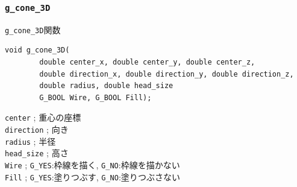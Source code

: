 \documentclass[platex,a4paper,12pt]{jsarticle}%
\begin{document}




\clearpage
\subsubsection{\texttt{g\_cone\_3D}}

\begin{itembox}[l]{\texttt{g\_cone\_3D}関数}
\begin{verbatim}
void g_cone_3D(
        double center_x, double center_y, double center_z,
        double direction_x, double direction_y, double direction_z,
        double radius, double head_size
        G_BOOL Wire, G_BOOL Fill);
\end{verbatim}
\verb|center| ; 重心の座標\\
\verb|direction| ; 向き\\
\verb|radius| ; 半径\\
\verb|head_size| ; 高さ\\
\verb|Wire| ; \verb|G_YES|:枠線を描く, \verb|G_NO|:枠線を描かない \\
\verb|Fill| ; \verb|G_YES|:塗りつぶす, \verb|G_NO|:塗りつぶさない
\end{itembox}
\end{document}
